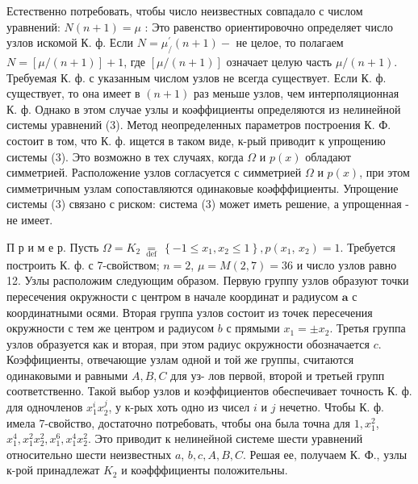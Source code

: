 \documentclass[10pt]{article}
\begin{document}
Естественно потребовать, чтобы число неизвестных совпадало с числом уравнений: $N(n+1)=\mu$ : Это равенство ориентировочно определяет число узлов искомой К. ф. Если $N=\mu_{/}^{\prime}(n+1)-$ не целое, то полагаем $N=[\mu /(n+1)]+1$, где $[\mu /(n+1)]$ означает целую часть $\mu /(n+1)$. Требуемая $К$. ф. с указанным числом узлов не всегда существует. Если К. ф. существует, то она имеет в $(n+1)$ раз меньше узлов, чем интерполяционная К. ф. Однако в этом случае узлы и коәффициенты определяются из нелинейной системы уравнений (3). Метод неопределенных параметров построения $К$. Ф. состоит в том, что К. ф. ищется в таком виде, к-рый приводит к упрощению системы (3). Это возможно в тех случаях, когда $\Omega$ и $p(x)$ обладают симметрией. Расположение узлов согласуется с симметрией $\Omega$ и $p(x)$, при этом симметричным узлам сопоставляются одинаковые коәфффициенты. Упрощение системы (3) связано с риском: система (3) может иметь решение, а упрощенная - не имеет.



П р и м е р. Пусть $\Omega=K_{2} \underset{\text { def }}{=}\left\{-1 \leqslant x_{1}, x_{2} \leqslant 1\right\}, p\left(x_{1}\right.$, $\left.x_{2}\right)=1$. Требуется построить К. ф. с 7-свойством; $n=2$, $\mu=M(2,7)=36$ и число узлов равно 12. Узлы расположим следующим образом. Первую группу узлов образуют точки пересечения окружности с центром в начале координат и радиусом $\boldsymbol{a}$ с координатными осями. Вторая группа узлов состоит из точек пересечения окружности с тем же центром и радиусом $b$ с прямыми $x_{1}= \pm x_{2}$. Третья группа узлов образуется как и вторая, при этом радиус окружности обозначается $c$. Коэффициенты, отвечающие узлам одной и той же группы, считаются одинаковыми и равными $A, B, C$ для уз- лов первой, второй и третьей групп соответственно. Такой выбор узлов и коэффициентов обеспечивает точность К. ф. для одночленов $x_{1}^{i} x_{2}^{j}$, у к-рых хоть одно из чисел $i$ и $j$ нечетно. Чтобы К. ф. имела 7-свойство, достаточно потребовать, чтобы она была точна для $1, x_{1}^{2}$, $x_{1}^{4}, x_{1}^{2} x_{2}^{2}, x_{1}^{6}, x_{1}^{4} x_{2}^{2}$. Это приводит к нелинейной системе шести уравнений относительно шести неизвестных $a$, $b, c, A, B, C$. Решая ее, получаем К. Ф., узлы к-рой принадлежат $K_{2}$ и коәфффициенты положительны.
\end{document}
